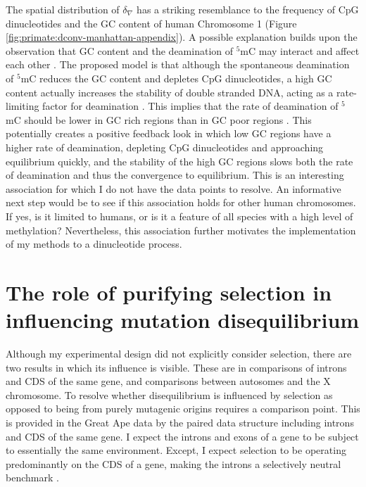 The spatial distribution of $\delta_\nabla$ has a striking resemblance to the frequency of CpG dinucleotides and the GC content of human Chromosome 1 (Figure \ref{fig:primate:dconv-manhattan-appendix}). A possible explanation builds upon the observation that GC content and the deamination of $^5$mC may interact and affect each other \citep{Fryxell2000CytosineIsochores, Mugal2015EvolutionaryGenomes}. The proposed model is that although the spontaneous deamination of $^5$mC reduces the GC content and depletes CpG dinucleotides,  a high GC content actually increases the stability of double stranded DNA, acting as a rate-limiting factor for deamination \citep{Mugal2015EvolutionaryGenomes}. This implies that the rate of deamination of $^5$mC should be lower in GC rich regions than in GC poor regions \citep{Mugal2015EvolutionaryGenomes}. This potentially creates a positive feedback look in which low GC regions have a higher rate of deamination, depleting CpG dinucleotides and approaching equilibrium quickly, and the stability of the high GC regions slows both the rate of deamination and thus the convergence to equilibrium. This is an interesting association for which I do not have the data points to resolve. An informative next step would be to see if this association holds for other human chromosomes. If yes, is it limited to humans, or is it a feature of all species with a high level of methylation? Nevertheless, this association further motivates the implementation of my methods to a dinucleotide process.

\section{The role of purifying selection in influencing mutation disequilibrium}

Although my experimental design did not explicitly consider selection, there are two results in which its influence is visible. These are in comparisons of introns and CDS of the same gene, and comparisons between autosomes and the X chromosome. To resolve whether disequilibrium is influenced by selection as opposed to being from purely mutagenic origins requires a comparison point. This is provided in the Great Ape data by the paired data structure including introns and CDS of the same gene. I expect the introns and exons of a gene to be subject to essentially the same environment. Except, I expect selection to be operating predominantly on the CDS of a gene, making the introns a selectively neutral benchmark \citep{Graur2013OnENCODE}. 

